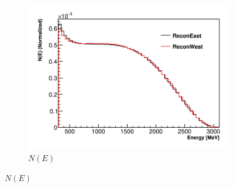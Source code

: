 \begin{figure}
\centering
    \begin{subfigure}[t]{0.45\textwidth}
        \centering
        \includegraphics[width=\textwidth]{ReconEastvWest_N}
        \caption{$N(E)$}
    \end{subfigure}%


\end{figure}
